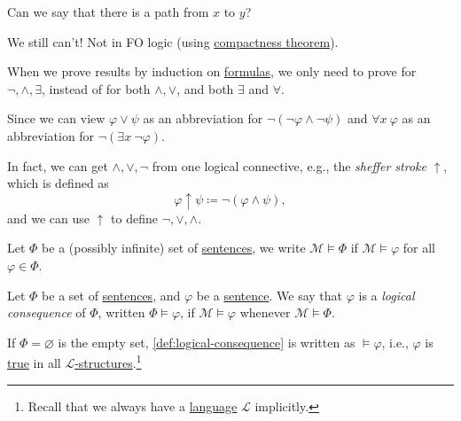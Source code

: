 \begin{problem*}
	Can we say that there is a path from \(x\) to \(y\)?
\end{problem*}
\begin{answer}
	We still can't! Not in FO logic (using \hyperref[thm:compactness]{compactness theorem}).
\end{answer}

\begin{remark}
	When we prove results by induction on \hyperref[def:formula]{formulas}, we only need to prove for \(\lnot , \land , \exists \), instead of for both \(\land , \lor \), and both \(\exists \) and \(\forall \).
\end{remark}
\begin{explanation}
	Since we can view \(\varphi \lor \psi \) as an abbreviation for \(\lnot (\lnot \varphi \land \lnot \psi ) \) and \(\forall x\ \varphi \) as an abbreviation for \(\lnot (\exists x\ \lnot \varphi )\).
\end{explanation}

\begin{remark}
	In fact, we can get \(\land , \lor , \lnot\) from one logical connective, e.g., the \emph{sheffer stroke} \(\uparrow \), which is defined as
	\[
		\varphi \uparrow \psi \coloneqq \lnot(\varphi \land \psi ),
	\]
	and we can use \(\uparrow \) to define \(\lnot, \lor , \land \).
\end{remark}

\begin{notation}
	Let \(\Phi \) be a (possibly infinite) set of \hyperref[def:sentence]{sentences}, we write \(\mathcal{M} \models \Phi \) if \(\mathcal{M} \models \varphi \) for all \(\varphi \in \Phi \).
\end{notation}

\begin{definition}\label{def:logical-consequence}
	Let \(\Phi \) be a set of \hyperref[def:sentence]{sentences}, and \(\varphi \) be a \hyperref[def:sentence]{sentence}. We say that \(\varphi \) is a \emph{logical consequence} of \(\Phi \), written \(\Phi \models \varphi \), if \(\mathcal{M} \models \varphi \) whenever \(\mathcal{M} \models \Phi \).
\end{definition}

If \(\Phi = \varnothing \) is the empty set, \autoref{def:logical-consequence} is written as \(\models \varphi \), i.e., \(\varphi \) is \hyperref[def:truth]{true} in all \hyperref[def:structure]{\(\mathcal{L} \)-structures}.\footnote{Recall that we always have a \hyperref[def:language]{language} \(\mathcal{L} \) implicitly.}

